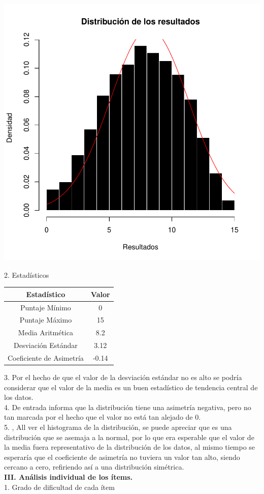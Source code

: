 \documentclass{article}
\begin{document}
\includegraphics{Documento_de_prueba-005}

2. Estadísticos

\begin{center}
 \begin{tabular}{||c c||} 
 \hline
 Estadístico & Valor \\ [0.5ex] 
 \hline\hline
 Puntaje Mínimo & 0  \\ 
 \hline
 Puntaje Máximo & 15  \\
 \hline
 Media Aritmética & 8.2  \\
 \hline
 Desviación Estándar & 3.12 \\
 \hline
 Coeficiente de Asimetría & -0.14 \\ [1ex] 
 \hline
\end{tabular}
\end{center}

3. Por el hecho de que el valor de la desviación estándar no es alto se podría considerar que el valor de la media es un buen estadístico de tendencia central de los datos. \\

4. De entrada informa que la distribución tiene una asimetría negativa, pero no tan marcada por el hecho que el valor no está tan alejado de 0. \\

5. , All ver el histograma de la distribución, se puede apreciar que es una distribución que se asemaja a la normal, por lo que era esperable que el valor de la media fuera representativo de la distribución de los datos, al mismo tiempo se esperaría que el coeficiente de asimetría no tuviera un valor tan alto, siendo cercano a cero, refiriendo así a una distribución simétrica.\\ 
\textbf{III. Análisis individual de los ítems.} \\
1. Grado de dificultad de cada ítem 
\end{document}
